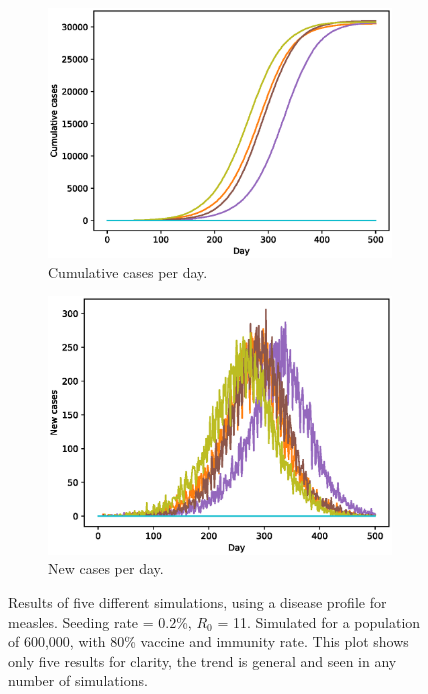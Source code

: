 \documentclass[runningheads]{llncs}
\begin{document}
\begin{figure}[h!]
	\centering
	\begin{subfigure}[b]{0.7\linewidth}
		\includegraphics[width=\linewidth]{cases_cum.eps}
		\caption{Cumulative cases per day.}
	\end{subfigure}
	\begin{subfigure}[b]{0.7\linewidth}
		\includegraphics[width=\linewidth]{cases_per_day.eps}
		\caption{New cases per day.}
	\end{subfigure}
	\caption{Results of five different simulations, using a disease profile for measles. Seeding rate = $0.2$\%, $R_0$ = 11. Simulated for a population of 600,000, with 80\% vaccine and immunity rate. This plot shows only five results for clarity, the trend is general and seen in any number of simulations.}
	\label{casesPlots}
\end{figure}
\clearpage
\end{document}

